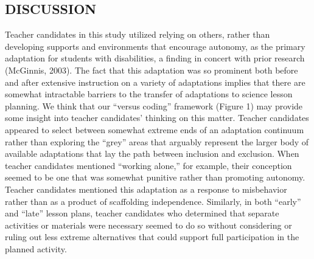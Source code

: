 \documentclass[11.5pt]{sig-alternate} %
\begin{document}
\begin{large}
\section*{DISCUSSION}

Teacher candidates in this study utilized relying on others, rather than developing supports and environments that encourage autonomy, as the primary adaptation for students with disabilities, a finding in concert with prior research (McGinnis, 2003).  The fact that this adaptation was so prominent both before and after extensive instruction on a variety of adaptations implies that there are somewhat intractable barriers to the transfer of adaptations to science lesson planning.  We think that our “versus coding” framework (Figure 1) may provide some insight into teacher candidates’ thinking on this matter. Teacher candidates appeared to select between somewhat extreme ends of an adaptation continuum rather than exploring the “grey” areas that arguably represent the larger body of available adaptations that lay the path between inclusion and exclusion. When teacher candidates mentioned “working alone,” for example, their conception seemed to be one that was somewhat punitive rather than promoting autonomy.  Teacher candidates mentioned this adaptation as a response to misbehavior rather than as a product of scaffolding independence. Similarly, in both “early” and “late” lesson plans, teacher candidates who determined that separate activities or materials were necessary seemed to do so without considering or ruling out less extreme alternatives that could support full participation in the planned activity.


\end{large}
\end{document}
